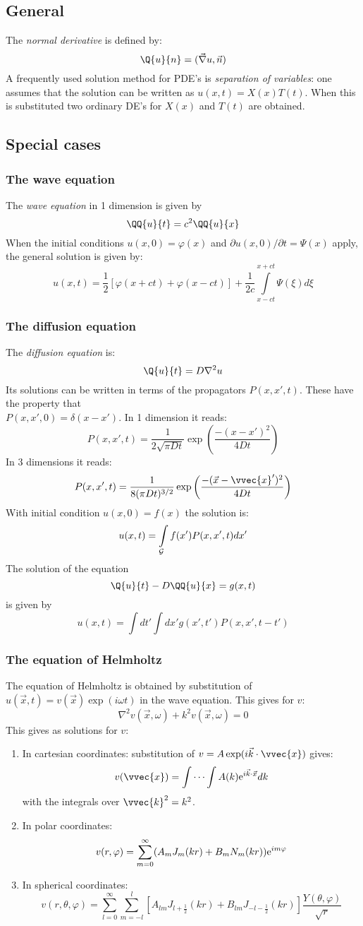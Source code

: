 \subsection{General}
The {\it normal derivative} is defined by:
\[
\Q{u}{n}=(\vec{\nabla}u,\vec{n})
\]
A frequently used solution method for PDE's is {\it separation of variables}:
one assumes that the solution can be written as $u(x,t)=X(x)T(t)$. When this
is substituted two ordinary DE's for $X(x)$ and $T(t)$ are obtained.

\subsection{Special cases}
\subsubsection{The wave equation}
The {\it wave equation} in 1 dimension is given by
\[
\QQ{u}{t}=c^2\QQ{u}{x}
\]
When the initial conditions $u(x,0)=\varphi(x)$ and
$\partial u(x,0)/\partial t=\Psi(x)$ apply, the general solution is given by:
\[
u(x,t)=\frac{1}{2}\left[\varphi(x+ct)+\varphi(x-ct)\right]+\frac{1}{2c}
\int\limits_{x-ct}^{x+ct}\Psi(\xi)d\xi
\]

\subsubsection{The diffusion equation}
The {\it diffusion equation} is:
\[
\Q{u}{t}=D\nabla^2u
\]
Its solutions can be written in terms of the propagators $P(x,x',t)$. These
have the property that\\ $P(x,x',0)=\delta(x-x')$. In 1 dimension it reads:
\[
P(x,x',t)=\frac{1}{2\sqrt{\pi Dt}}\exp\left(\frac{-(x-x')^2}{4Dt}\right)
\]
In 3 dimensions it reads:
\[
P(x,x',t)=\frac{1}{8(\pi Dt)^{3/2}}\exp\left(\frac{-(\vec{x}-\vvec{x}')^2}{4Dt}\right)
\]
With initial condition $u(x,0)=f(x)$ the solution is:
\[
u(x,t)=\int\limits_{\cal G}f(x')P(x,x',t)dx'
\]
The solution of the equation
\[
\Q{u}{t}-D\QQ{u}{x}=g(x,t)
\]
is given by
\[
u(x,t)=\int dt' \int dx'g(x',t')P(x,x',t-t')
\]

\subsubsection{The equation of Helmholtz}
The equation of Helmholtz is obtained by substitution of
$u(\vec{x},t)=v(\vec{x})\exp(i\omega t)$ in the wave equation. This gives
for $v$:
\[
\nabla^2v(\vec{x},\omega)+k^2v(\vec{x},\omega)=0
\]
This gives as solutions for $v$:
\begin{enumerate}
\item In cartesian coordinates: substitution of
$v=A\exp(i\vec{k}\cdot\vvec{x})$ gives:
\[
v(\vvec{x})=\int\cdots\int A(k){\rm e}^{i\vec{k}\cdot\vec{x}}dk
\]
with the integrals over $\vvec{k}^2=k^2$.
\item In polar coordinates:
\[
v(r,\varphi)=\sum_{m=0}^\infty(A_mJ_m(kr)+B_mN_m(kr)){\rm e}^{im\varphi}
\]
\item In spherical coordinates:
\[
v(r,\theta,\varphi)=\sum_{l=0}^\infty\sum_{m=-l}^l[A_{lm}J_{l+\frac{1}{2}}(kr)+B_{lm}J_{-l-\frac{1}{2}}(kr)]\frac{Y(\theta,\varphi)}{\sqrt{r}}
\]
\end{enumerate}

